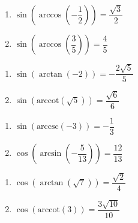 \begin{multicols}{2}

\begin{enumerate}

\setcounter{enumi}{\value{HW}}

\item  $\sin\left(\arccos\left(-\dfrac{1}{2}\right)\right) = \dfrac{\sqrt{3}}{2}$
\item  $\sin\left(\arccos\left(\dfrac{3}{5}\right)\right) = \dfrac{4}{5}$

\setcounter{HW}{\value{enumi}}

\end{enumerate}

\end{multicols}

\begin{multicols}{2}

\begin{enumerate}

\setcounter{enumi}{\value{HW}}

\item  $\sin\left(\arctan\left(-2\right)\right) = -\dfrac{2\sqrt{5}}{5}$
\item  $\sin\left(\text{arccot}\left(\sqrt{5}\right)\right) = \dfrac{\sqrt{6}}{6}$

\setcounter{HW}{\value{enumi}}

\end{enumerate}

\end{multicols}

\begin{multicols}{2}

\begin{enumerate}

\setcounter{enumi}{\value{HW}}

\item  $\sin\left(\text{arccsc}\left(-3\right)\right) = -\dfrac{1}{3}$ 
\item  $\cos\left(\arcsin\left(-\dfrac{5}{13}\right)\right) = \dfrac{12}{13}$

\setcounter{HW}{\value{enumi}}

\end{enumerate}

\end{multicols}

\begin{multicols}{2}

\begin{enumerate}

\setcounter{enumi}{\value{HW}}

\item  $\cos\left(\arctan\left(\sqrt{7} \right)\right) = \dfrac{\sqrt{2}}{4}$
\item  $\cos\left(\text{arccot}\left( 3 \right)\right) = \dfrac{3\sqrt{10}}{10}$

\setcounter{HW}{\value{enumi}}

\end{enumerate}

\end{multicols}

